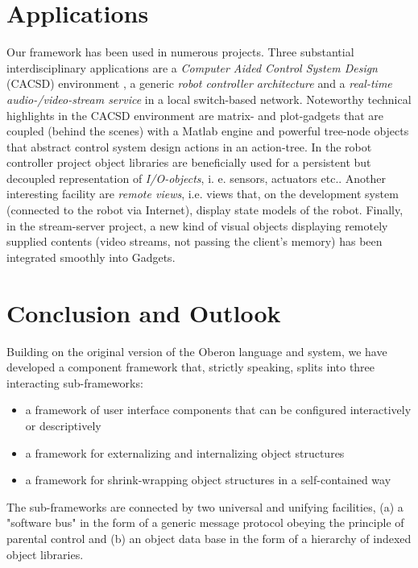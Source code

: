 \section*{Applications}

Our framework has been used in numerous projects. Three substantial
interdisciplinary applications are a {\em Computer Aided Control System
Design} (CACSD) environment \cite {Q1}, a generic {\em robot controller
architecture} \cite {R1} and a {\em real-time audio-/video-stream
service} in a local switch-based network. Noteworthy technical highlights
in the CACSD environment are matrix- and plot-gadgets that are coupled
(behind the scenes) with a Matlab engine and powerful tree-node
objects that abstract control system design actions in an action-tree.
In the robot controller project object libraries are beneficially used for
a persistent but decoupled representation of {\em I/O-objects\/},
i. e. sensors, actuators etc.. Another interesting facility are {\em remote
views\/}, i.e. views that, on the development system (connected to
the robot via Internet), display state models of the robot. Finally,
in the stream-server project, a new kind of visual objects displaying
remotely supplied contents (video streams, not passing the client's
memory) has been integrated smoothly into Gadgets.

\section*{Conclusion and Outlook}

Building on the original version of the Oberon language and system,
we have developed a component framework that, strictly speaking,
splits into three interacting sub-frameworks:

\begin{itemize}
\item a framework of user interface components that can be configured
interactively or descriptively
\item a framework for externalizing and internalizing object structures
\item a framework for shrink-wrapping object structures in a self-contained
way
\end{itemize}

The sub-frameworks are connected by two universal and unifying facilities,
(a) a "software bus" in the form of a generic message protocol obeying
the principle of parental control and (b) an object data base in the form
of a hierarchy of indexed object libraries.

